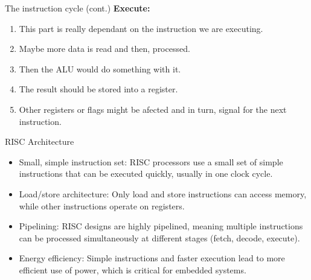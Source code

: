 \documentclass[aspectratio=169]{beamer}
\begin{document}
\begin{frame}{The instruction cycle (cont.)}
  \textbf{\large Execute:}
  \begin{enumerate}
        \item <2-> This part is really dependant on the instruction we are executing.
        \item <3-> Maybe more data is read and then, processed.
        \item <4-> Then the ALU would do something with it.
        \item <5-> The result should be stored into a register.
        \item <6-> Other registers or flags might be afected and in turn, signal for the next instruction.
  \end{enumerate}
\end{frame}

\begin{frame}{RISC Architecture}
  \begin{itemize}
      \item <1-> Small, simple instruction set: RISC processors use a small set of simple instructions that can be executed quickly, usually in one clock cycle.
      \item <2-> Load/store architecture: Only load and store instructions can access memory, while other instructions operate on registers.
      \item <3-> Pipelining: RISC designs are highly pipelined, meaning multiple instructions can be processed simultaneously at different stages (fetch, decode, execute).
      \item <4-> Energy efficiency: Simple instructions and faster execution lead to more efficient use of power, which is critical for embedded systems.
  \end{itemize}
\end{frame}
\end{document}

